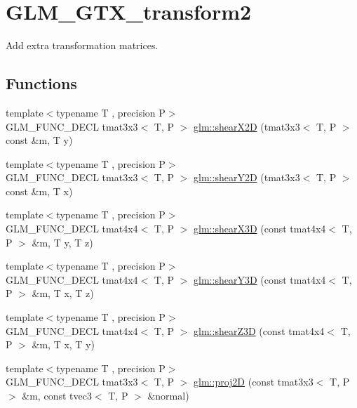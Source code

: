 \hypertarget{group__gtx__transform2}{}\section{G\+L\+M\+\_\+\+G\+T\+X\+\_\+transform2}
\label{group__gtx__transform2}


Add extra transformation matrices.  


\subsection*{Functions}
\begin{DoxyCompactItemize}
\item 
{\footnotesize template$<$typename T , precision P$>$ }\\G\+L\+M\+\_\+\+F\+U\+N\+C\+\_\+\+D\+E\+C\+L tmat3x3$<$ T, P $>$ \hyperlink{group__gtx__transform2_ga10f6c62d8f827c4cacedb71fd05e4ba2}{glm\+::shear\+X2\+D} (tmat3x3$<$ T, P $>$ const \&m, T y)
\item 
{\footnotesize template$<$typename T , precision P$>$ }\\G\+L\+M\+\_\+\+F\+U\+N\+C\+\_\+\+D\+E\+C\+L tmat3x3$<$ T, P $>$ \hyperlink{group__gtx__transform2_ga21ade82859e09a5cdaf4a01fbf8dc61b}{glm\+::shear\+Y2\+D} (tmat3x3$<$ T, P $>$ const \&m, T x)
\item 
{\footnotesize template$<$typename T , precision P$>$ }\\G\+L\+M\+\_\+\+F\+U\+N\+C\+\_\+\+D\+E\+C\+L tmat4x4$<$ T, P $>$ \hyperlink{group__gtx__transform2_gae06ce274e4754f925d5d68440e89452e}{glm\+::shear\+X3\+D} (const tmat4x4$<$ T, P $>$ \&m, T y, T z)
\item 
{\footnotesize template$<$typename T , precision P$>$ }\\G\+L\+M\+\_\+\+F\+U\+N\+C\+\_\+\+D\+E\+C\+L tmat4x4$<$ T, P $>$ \hyperlink{group__gtx__transform2_ga31253ea18fdcdfde08c134c8b67688f7}{glm\+::shear\+Y3\+D} (const tmat4x4$<$ T, P $>$ \&m, T x, T z)
\item 
{\footnotesize template$<$typename T , precision P$>$ }\\G\+L\+M\+\_\+\+F\+U\+N\+C\+\_\+\+D\+E\+C\+L tmat4x4$<$ T, P $>$ \hyperlink{group__gtx__transform2_ga5558ac64a7144685bf2eb4483a0e2f51}{glm\+::shear\+Z3\+D} (const tmat4x4$<$ T, P $>$ \&m, T x, T y)
\item 
{\footnotesize template$<$typename T , precision P$>$ }\\G\+L\+M\+\_\+\+F\+U\+N\+C\+\_\+\+D\+E\+C\+L tmat3x3$<$ T, P $>$ \hyperlink{group__gtx__transform2_gacfce1085167a8bfb71a55ea14d22752f}{glm\+::proj2\+D} (const tmat3x3$<$ T, P $>$ \&m, const tvec3$<$ T, P $>$ \&normal)

\end{DoxyCompactItemize}
